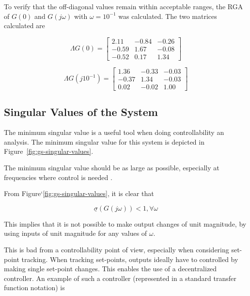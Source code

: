 To verify that the off-diagonal values remain within acceptable ranges, the RGA of $G(0)$ and $G(j\omega)$ with $\omega = 10^{-1}$ was calculated. The two matrices calculated are

\begin{equation}
	\Lambda G(0) = \begin{bmatrix}
	2.11 & -0.84 & -0.26\\
	-0.59 & 1.67 & -0.08\\
	-0.52 & 0.17 & 1.34
	\end{bmatrix}
\end{equation}

\begin{equation}
\Lambda G(j10^{-1}) = \begin{bmatrix}
1.36 & -0.33 & -0.03\\
-0.37 & 1.34 & -0.03\\
0.02 & -0.02 & 1.00
\end{bmatrix}
\end{equation}

\subsection{Singular Values of the System}

The minimum singular value is a useful tool when doing controllability an analysis. The minimum singular value for this system is depicted in Figure~\ref{fig:gs-singular-values}.

The minimum singular value should be as large as possible, especially at frequencies where control is needed \parencite{skogestad}.

From Figure`\ref{fig:gs-singular-values}, it is clear that

\begin{equation}
	\label{eq: Min singular alue criteria}
	\underline{\sigma}(G(j\omega)) < 1 , \forall \omega
\end{equation}

This implies that it is not possible to make output changes of unit magnitude, by using inputs of unit magnitude for any values of $\omega$. 

This is bad from a controllability point of view, especially when considering set-point tracking. When tracking set-points, outputs ideally have to controlled by making single set-point changes. This enables the use of a decentralized controller. An example of such a controller (represented in a standard transfer function notation) is

